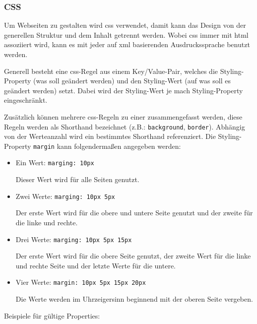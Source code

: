 \subsubsection{CSS}

Um Webseiten zu gestalten wird \gls{css} verwendet, damit kann das Design von der generellen Struktur und dem Inhalt getrennt werden. Wobei \gls{css} immer mit \gls{html} assoziiert wird, kann es mit jeder auf \gls{xml} basierenden Ausdruckssprache benutzt werden.  \cite{HTML-CSS}

Generell besteht eine \gls{css}-Regel aus einem Key/Value-Pair, welches die Styling-Property (was soll geändert werden) und den Styling-Wert (auf was soll es geändert werden) setzt. Dabei wird der Styling-Wert je mach Styling-Property eingeschränkt.

Zusätzlich können mehrere \gls{css}-Regeln zu einer zusammengefasst werden, diese Regeln werden als Shorthand bezeichnet (z.B.: \lstinline{background}, \lstinline{border}). Abhängig von der Werteanzahl wird ein bestimmtes Shorthand referenziert. Die Styling-Property \lstinline{margin} kann folgendermaßen angegeben werden:

\begin{itemize}
    \item Ein Wert: \lstinline{marging: 10px}

          Dieser Wert wird für alle Seiten genutzt.
    \item Zwei Werte: \lstinline{marging: 10px 5px}

          Der erste Wert wird für die obere und untere Seite genutzt und der zweite für die linke und rechte.
    \item Drei Werte:  \lstinline{marging: 10px 5px 15px}

          Der erste Wert wird für die obere Seite genutzt, der zweite Wert für die linke und rechte Seite und der letzte Werte für die untere.
    \item Vier Werte: \lstinline{margin: 10px 5px 15px 20px}

          Die Werte werden im Uhrzeigersinn beginnend mit der oberen Seite vergeben.
\end{itemize}

Beispiele für gültige Properties:

